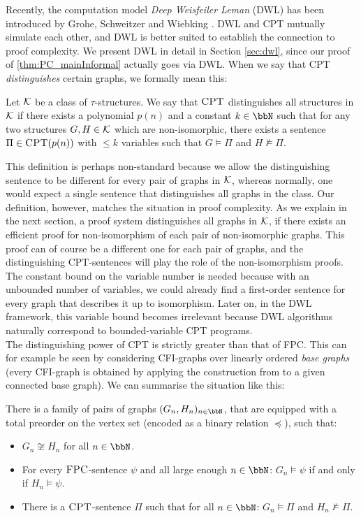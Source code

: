 \documentclass[a4paper,UKenglish,cleveref, autoref, thm-restate]{lipics-v2021}
\newcommand{\FPC}{\mbox{\sc FPC}}
\newcommand{\CPT}{\mbox{\sc CPT}}
\newcommand{\G}{\ensuremath{\mathfrak{G}}}
\newcommand{\Kk}{{\cal K}}
\renewcommand{\G}{G} %
\begin{document}
	Recently, the computation model \emph{Deep Weisfeiler Leman} (DWL) has been introduced by Grohe, Schweitzer and Wiebking \cite{dwl}. DWL and CPT mutually simulate each other, and DWL is better suited to establish the connection to proof complexity.
	We present DWL in detail in Section \ref{sec:dwl}, since our proof of \autoref{thm:PC_mainInformal} actually goes via DWL.
	When we say that CPT \emph{distinguishes} certain graphs, we formally mean this:
	\begin{definition}
		\label{def:distinguishingInCPT}
		Let $\Kk$ be a class of $\tau$-structures. We say that $\CPT$ distinguishes all structures in $\Kk$ if there exists a polynomial $p(n)$ and a constant $k \in \bbN$ such that for any two structures $G, H \in \Kk$ which are non-isomorphic, there exists a sentence $\Pi \in \CPT(p(n))$ with $\leq k$ variables such that $G \models \Pi$ and $H \not\models \Pi$. 
	\end{definition}	
	This definition is perhaps non-standard because we allow the distinguishing sentence to be different for every pair of graphs in $\Kk$, whereas normally, one would expect a single sentence that distinguishes all graphs in the class. Our definition, however, matches the situation in proof complexity. As we explain in the next section, a proof system distinguishes all graphs in $\Kk$, if there exists an efficient proof for non-isomorphism of each pair of non-isomorphic graphs. This proof can of course be a different one for each pair of graphs, and the distinguishing CPT-sentences will play the role of the non-isomorphism proofs. The constant bound on the variable number is needed because with an unbounded number of variables, we could already find a first-order sentence for every graph that describes it up to isomorphism. Later on, in the DWL framework, this variable bound becomes irrelevant because DWL algorithms naturally correspond to bounded-variable CPT programs.\\
	
	The distinguishing power of CPT is strictly greater than that of FPC. This can for example be seen by considering CFI-graphs over linearly ordered \emph{base graphs} (every CFI-graph is obtained by applying the construction from \cite{caifurimm92} to a given connected base graph). We can summarise the situation like this:
	\begin{theorem}
		\label{thm:separationCPTandFPC}
		There is a  family of pairs of graphs $(G_n,H_n)_{n \in \bbN}$, that are equipped with a total preorder on the vertex set (encoded as a binary relation $\preceq$), such that:
		\begin{itemize}
			\item $G_n \not\cong H_n$ for all $n \in \bbN$. 
			\item For every $\FPC$-sentence $\psi$ and all large enough $n \in \bbN$: $\G_n \models \psi$ if and only if $H_n \models \psi$.
			\item There is a $\CPT$-sentence $\Pi$ such that for all $n \in \bbN$: $G_n \models \Pi$ and $H_n \not\models \Pi$.
		\end{itemize}	
	\end{theorem}	
\end{document}
